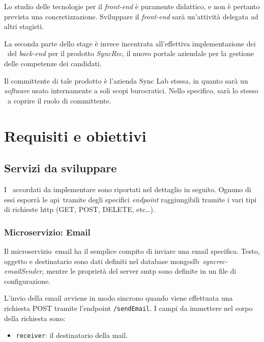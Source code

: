 Lo studio delle tecnologie per il \textit{front-end} è puramente didattico, e non è pertanto prevista una concretizzazione.
Sviluppare il \textit{front-end} sarà un'attività delegata ad altri stagisti.

La seconda parte dello stage è invece incentrata all'effettiva implementazione dei \gloss\ del \textit{back-end} per il prodotto \textit{SyncRec}, il nuovo portale aziendale per la gestione delle competenze dei candidati.

Il committente di tale prodotto è l'azienda Sync Lab stessa, in quanto sarà un \textit{software} usato internamente a soli scopi burocratici.
Nello specifico, sarà lo stesso \fabio\ a coprire il ruolo di committente.

\section{Requisiti e obiettivi}

\subsection{Servizi  da sviluppare}

I \gloss\ accordati da implementare sono riportati nel dettaglio in seguito. Ognuno di essi esporrà le \gls{api}\gloss\ tramite degli specifici \textit{endpoint}
raggiungibili tramite i vari tipi di richieste \acrshort{http} (GET, POST, DELETE, etc\dots).


\subsubsection{Microservizio: Email}

Il \gls{microservizio}\gloss\ email ha il semplice compito di inviare una email specifica.
Testo, oggetto e destinatario sono dati definiti nel database \gls{mongodb}\gloss\
\textit{syncrec-emailSender}, mentre le proprietà del server \acrshort{smtp} sono definite in un file di configurazione.

L'invio della email avviene in modo sincrono quando viene effettuata una richiesta POST tramite l'endpoint \texttt{/sendEmail}.
I campi da immettere nel corpo della richiesta sono:
\begin{itemize}
	\item \texttt{receiver}: il destinatario della mail.
\end{itemize}

